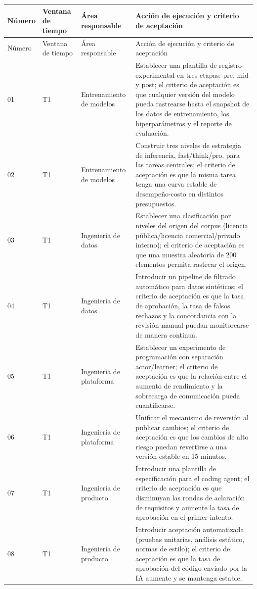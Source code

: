 \documentclass[a4paper]{article}
\begin{document}
\begin{longtable}{p{}p{}p{}p{}}
\toprule
Número & Ventana de tiempo & Área responsable & Acción de ejecución y criterio de aceptación \\
\midrule
\endfirsthead
\toprule
Número & Ventana de tiempo & Área responsable & Acción de ejecución y criterio de aceptación \\
\midrule
\endhead
01 & T1 & Entrenamiento de modelos & Establecer una plantilla de registro experimental en tres etapas: pre, mid y post; el criterio de aceptación es que cualquier versión del modelo pueda rastrearse hasta el snapshot de los datos de entrenamiento, los hiperparámetros y el reporte de evaluación. \\
02 & T1 & Entrenamiento de modelos & Construir tres niveles de estrategia de inferencia, fast/think/pro, para las tareas centrales; el criterio de aceptación es que la misma tarea tenga una curva estable de desempeño-costo en distintos presupuestos. \\
03 & T1 & Ingeniería de datos & Establecer una clasificación por niveles del origen del corpus (licencia pública/licencia comercial/privado interno); el criterio de aceptación es que una muestra aleatoria de 200 elementos permita rastrear el origen. \\
04 & T1 & Ingeniería de datos & Introducir un pipeline de filtrado automático para datos sintéticos; el criterio de aceptación es que la tasa de aprobación, la tasa de falsos rechazos y la concordancia con la revisión manual puedan monitorearse de manera continua. \\
05 & T1 & Ingeniería de plataforma & Establecer un experimento de programación con separación actor/learner; el criterio de aceptación es que la relación entre el aumento de rendimiento y la sobrecarga de comunicación pueda cuantificarse. \\
06 & T1 & Ingeniería de plataforma & Unificar el mecanismo de reversión al publicar cambios; el criterio de aceptación es que los cambios de alto riesgo puedan revertirse a una versión estable en 15 minutos. \\
07 & T1 & Ingeniería de producto & Introducir una plantilla de especificación para el coding agent; el criterio de aceptación es que disminuyan las rondas de aclaración de requisitos y aumente la tasa de aprobación en el primer intento. \\
08 & T1 & Ingeniería de producto & Introducir aceptación automatizada (pruebas unitarias, análisis estático, normas de estilo); el criterio de aceptación es que la tasa de aprobación del código enviado por la IA aumente y se mantenga estable. \\

\end{longtable}
\end{document}
